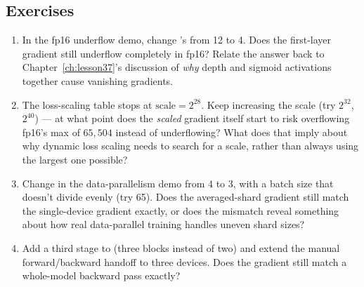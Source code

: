 \subsection*{Exercises}
\begin{enumerate}
  \item In the fp16 underflow demo, change 's  from 12 to 4. Does the first-layer gradient still underflow completely in fp16? Relate the answer back to Chapter~\ref{ch:lesson37}'s discussion of \emph{why} depth and sigmoid activations together cause vanishing gradients.
  \item The loss-scaling table stops at $\text{scale}=2^{28}$. Keep increasing the scale (try $2^{32}$, $2^{40}$) --- at what point does the \emph{scaled} gradient itself start to risk overflowing fp16's max of $65{,}504$ instead of underflowing? What does that imply about why dynamic loss scaling needs to search for a scale, rather than always using the largest one possible?
  \item Change  in the data-parallelism demo from 4 to 3, with a batch size that doesn't divide evenly (try 65). Does the averaged-shard gradient still match the single-device gradient exactly, or does the mismatch reveal something about how real data-parallel training handles uneven shard sizes?
  \item Add a third stage to  (three  blocks instead of two) and extend the manual forward/backward handoff to three devices. Does the gradient still match a whole-model backward pass exactly?
\end{enumerate}

\vfill
{}
